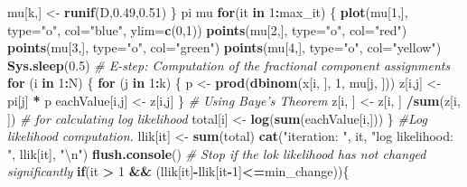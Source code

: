 \documentclass[]{article}
\newenvironment{Shaded}{\begin{snugshade}}{\end{snugshade}}
\newcommand{\KeywordTok}[1]{\textcolor[rgb]{0.13,0.29,0.53}{\textbf{#1}}}
\newcommand{\DataTypeTok}[1]{\textcolor[rgb]{0.13,0.29,0.53}{#1}}
\newcommand{\DecValTok}[1]{\textcolor[rgb]{0.00,0.00,0.81}{#1}}
\newcommand{\FloatTok}[1]{\textcolor[rgb]{0.00,0.00,0.81}{#1}}
\newcommand{\CharTok}[1]{\textcolor[rgb]{0.31,0.60,0.02}{#1}}
\newcommand{\StringTok}[1]{\textcolor[rgb]{0.31,0.60,0.02}{#1}}
\newcommand{\CommentTok}[1]{\textcolor[rgb]{0.56,0.35,0.01}{\textit{#1}}}
\newcommand{\ControlFlowTok}[1]{\textcolor[rgb]{0.13,0.29,0.53}{\textbf{#1}}}
\newcommand{\OperatorTok}[1]{\textcolor[rgb]{0.81,0.36,0.00}{\textbf{#1}}}
\newcommand{\NormalTok}[1]{#1}
\begin{document}
\begin{Shaded}
\begin{Highlighting}[]
\NormalTok{mu[k,] <-}\StringTok{ }\KeywordTok{runif}\NormalTok{(D,}\FloatTok{0.49}\NormalTok{,}\FloatTok{0.51}\NormalTok{)}
\NormalTok{\}}
\NormalTok{pi}
\NormalTok{mu}
\ControlFlowTok{for}\NormalTok{(it }\ControlFlowTok{in} \DecValTok{1}\OperatorTok{:}\NormalTok{max_it) \{}
\KeywordTok{plot}\NormalTok{(mu[}\DecValTok{1}\NormalTok{,], }\DataTypeTok{type=}\StringTok{"o"}\NormalTok{, }\DataTypeTok{col=}\StringTok{"blue"}\NormalTok{, }\DataTypeTok{ylim=}\KeywordTok{c}\NormalTok{(}\DecValTok{0}\NormalTok{,}\DecValTok{1}\NormalTok{))}
\KeywordTok{points}\NormalTok{(mu[}\DecValTok{2}\NormalTok{,], }\DataTypeTok{type=}\StringTok{"o"}\NormalTok{, }\DataTypeTok{col=}\StringTok{"red"}\NormalTok{)}
\KeywordTok{points}\NormalTok{(mu[}\DecValTok{3}\NormalTok{,], }\DataTypeTok{type=}\StringTok{"o"}\NormalTok{, }\DataTypeTok{col=}\StringTok{"green"}\NormalTok{)}
\KeywordTok{points}\NormalTok{(mu[}\DecValTok{4}\NormalTok{,], }\DataTypeTok{type=}\StringTok{"o"}\NormalTok{, }\DataTypeTok{col=}\StringTok{"yellow"}\NormalTok{)}
\KeywordTok{Sys.sleep}\NormalTok{(}\FloatTok{0.5}\NormalTok{)}
\CommentTok{# E-step: Computation of the fractional component assignments}
\ControlFlowTok{for}\NormalTok{ (i }\ControlFlowTok{in} \DecValTok{1}\OperatorTok{:}\NormalTok{N) \{}
\ControlFlowTok{for}\NormalTok{ (j }\ControlFlowTok{in} \DecValTok{1}\OperatorTok{:}\NormalTok{k) \{}
\NormalTok{p <-}\StringTok{ }\KeywordTok{prod}\NormalTok{(}\KeywordTok{dbinom}\NormalTok{(x[i, ], }\DecValTok{1}\NormalTok{, mu[j, ]))}
\NormalTok{z[i,j] <-}\StringTok{ }\NormalTok{pi[j] }\OperatorTok{*}\StringTok{ }\NormalTok{p}
\NormalTok{eachValue[i,j] <-}\StringTok{ }\NormalTok{z[i,j]}
\NormalTok{\}}
\CommentTok{# Using Baye's Theorem}
\NormalTok{z[i, ] <-}\StringTok{ }\NormalTok{z[i, ] }\OperatorTok{/}\KeywordTok{sum}\NormalTok{(z[i, ])}
\CommentTok{# for calculating log likelihood}
\NormalTok{total[i] <-}\StringTok{ }\KeywordTok{log}\NormalTok{(}\KeywordTok{sum}\NormalTok{(eachValue[i,]))}
\NormalTok{\}}
\CommentTok{#Log likelihood computation.}
\NormalTok{llik[it] <-}\StringTok{ }\KeywordTok{sum}\NormalTok{(total)}
\KeywordTok{cat}\NormalTok{(}\StringTok{"iteration: "}\NormalTok{, it, }\StringTok{"log likelihood: "}\NormalTok{, llik[it], }\StringTok{"}\CharTok{\textbackslash{}n}\StringTok{"}\NormalTok{)}
\KeywordTok{flush.console}\NormalTok{()}
\CommentTok{# Stop if the lok likelihood has not changed significantly}
\ControlFlowTok{if}\NormalTok{(it }\OperatorTok{>}\StringTok{ }\DecValTok{1} \OperatorTok{&&}\StringTok{ }\NormalTok{(llik[it]}\OperatorTok{-}\NormalTok{llik[it}\OperatorTok{-}\DecValTok{1}\NormalTok{]}\OperatorTok{<=}\NormalTok{min_change))\{}

\end{Highlighting}
\end{Shaded}
\end{document}
